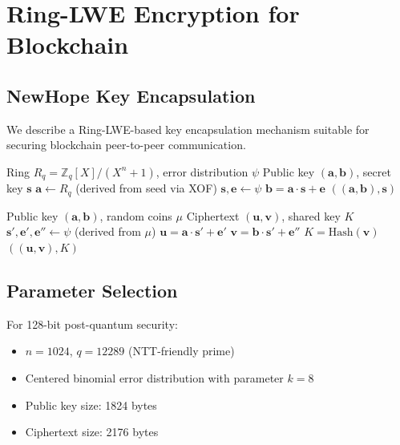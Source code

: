 \documentclass[11pt,a4paper]{article}
\begin{document}
\section{Ring-LWE Encryption for Blockchain}

\subsection{NewHope Key Encapsulation}

We describe a Ring-LWE-based key encapsulation mechanism suitable for securing blockchain peer-to-peer communication.

\begin{algorithm}
\caption{NewHope Key Generation}
\begin{algorithmic}[1]
\Require Ring $R_q = \mathbb{Z}_q[X]/(X^n + 1)$, error distribution $\psi$
\Ensure Public key $(\mathbf{a}, \mathbf{b})$, secret key $\mathbf{s}$
\State $\mathbf{a} \leftarrow R_q$ (derived from seed via XOF)
\State $\mathbf{s}, \mathbf{e} \leftarrow \psi$
\State $\mathbf{b} = \mathbf{a} \cdot \mathbf{s} + \mathbf{e}$
\State \Return $((\mathbf{a}, \mathbf{b}), \mathbf{s})$
\end{algorithmic}
\end{algorithm}

\begin{algorithm}
\caption{NewHope Encapsulation}
\begin{algorithmic}[1]
\Require Public key $(\mathbf{a}, \mathbf{b})$, random coins $\mu$
\Ensure Ciphertext $(\mathbf{u}, \mathbf{v})$, shared key $K$
\State $\mathbf{s}', \mathbf{e}', \mathbf{e}'' \leftarrow \psi$ (derived from $\mu$)
\State $\mathbf{u} = \mathbf{a} \cdot \mathbf{s}' + \mathbf{e}'$
\State $\mathbf{v} = \mathbf{b} \cdot \mathbf{s}' + \mathbf{e}''$
\State $K = \text{Hash}(\mathbf{v})$
\State \Return $((\mathbf{u}, \mathbf{v}), K)$
\end{algorithmic}
\end{algorithm}

\subsection{Parameter Selection}

For 128-bit post-quantum security:
\begin{itemize}
    \item $n = 1024$, $q = 12289$ (NTT-friendly prime)
    \item Centered binomial error distribution with parameter $k = 8$
    \item Public key size: 1824 bytes
    \item Ciphertext size: 2176 bytes
\end{itemize}
\end{document}
